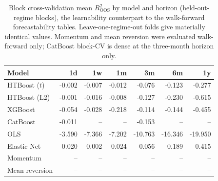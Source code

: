 \begin{table}[htbp]
\centering
\caption{Block cross-validation mean $R^2_{\text{OOS}}$ by model and horizon (held-out-regime blocks), the learnability counterpart to the walk-forward forecastability tables. Leave-one-regime-out folds give materially identical values. Momentum and mean reversion were evaluated walk-forward only; CatBoost block-CV is dense at the three-month horizon only.}
\label{tab:ch8_blockcv}
\footnotesize
\begin{tabular}{lrrrrrr}
\toprule
Model & 1d & 1w & 1m & 3m & 6m & 1y \\
\midrule
HTBoost ($t$) & -0.002 & -0.007 & -0.012 & -0.076 & -0.123 & -0.277 \\
HTBoost (L2) & -0.001 & -0.016 & -0.008 & -0.127 & -0.230 & -0.615 \\
XGBoost & -0.054 & -0.028 & -0.218 & -0.114 & -0.144 & -0.455 \\
CatBoost & -0.011 & -- & -- & -0.153 & -- & -- \\
OLS & -3.590 & -7.366 & -7.202 & -10.763 & -16.346 & -19.950 \\
Elastic Net & -0.020 & -0.002 & -0.024 & -0.056 & -0.189 & -0.415 \\
Momentum & -- & -- & -- & -- & -- & -- \\
Mean reversion & -- & -- & -- & -- & -- & -- \\
\bottomrule
\end{tabular}
\end{table}

